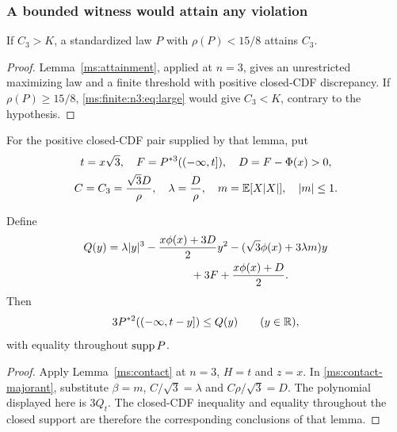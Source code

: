 \subsubsection{A bounded witness would attain any violation}
\begin{lemma}\label{ms:finite:n3:lem:attain}
If $C_3>K$, a standardized law $P$ with $\rho(P)<15/8$ attains $C_3$.
\end{lemma}
\begin{proof}
Lemma~\ref{ms:attainment}, applied at $n=3$, gives an unrestricted
maximizing law and a finite threshold with positive closed-CDF discrepancy. If
$\rho(P)\ge15/8$, \eqref{ms:finite:n3:eq:large} would give
$C_3<K$, contrary to the hypothesis.
\end{proof}
For the positive closed-CDF pair supplied by that lemma, put
\[
 \begin{gathered}
 t=x\sqrt3,\quad F=P^{*3}(( -\infty,t]),\quad D=F-\Phi(x)>0,\\
 C=C_3=\frac{\sqrt3D}{\rho},\quad \lambda=\frac D\rho,
 \quad m=\mathbb E[X|X|],\quad |m|\le1.
 \end{gathered}
\]

\begin{lemma}\label{ms:finite:n3:lem:contact}
Define
\begin{align}
 Q(y)={}&\lambda|y|^3-\frac{x\phi(x)+3D}{2}y^2
 -(\sqrt3\phi(x)+3\lambda m)y \notag\\
 &\hspace{22mm}+3F+\frac{x\phi(x)+D}{2}.
 \label{ms:finite:n3:eq:Q}
\end{align}
Then
\begin{equation}\label{ms:finite:n3:eq:contact}
 3P^{*2}(( -\infty,t-y])\le Q(y)\qquad(y\in\mathbb R),
\end{equation}
with equality throughout $\operatorname{supp} P$.
\end{lemma}
\begin{proof}
Apply Lemma~\ref{ms:contact} at $n=3$, $H=t$ and $z=x$.
In \eqref{ms:contact-majorant}, substitute $\beta=m$,
$C/\sqrt3=\lambda$ and $C\rho/\sqrt3=D$. The polynomial displayed
here is $3Q_t$. The closed-CDF inequality and equality throughout the
closed support are therefore the corresponding conclusions of that lemma.
\end{proof}

